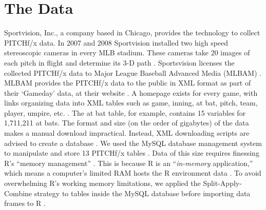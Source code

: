 \section{The Data} %
Sportvision, Inc., a company based in Chicago, provides the technology to collect PITCHf/x\textsuperscript{\textregistered} data. In 2007 and 2008 Sportvision installed two high speed stereoscopic cameras in every MLB\textsuperscript{\textregistered} stadium. These cameras take 20 images of each pitch in flight and determine its 3-D path \citep{Fast2010}. Sportsvision licenses the collected PITCHf/x\textsuperscript{\textregistered} data to Major League Baseball Advanced Media (MLBAM\textsuperscript{\textregistered}) \citep{Baumer2010}. MLBAM\textsuperscript{\textregistered} provides the PITCHf/x\textsuperscript{\textregistered} data to the public in XML format as part of  their  `Gameday' data, at their website \citep{Sievert2014}. A homepage exists for every game, with links organizing data into XML tables such as game, inning, at bat, pitch, team, player, umpire, etc. \citep{Sievert2014}. The at bat table, for example, contains 15 variables for 1,711,211 at bats. The format and size (on the order of gigabytes) of the data makes a manual download impractical. Instead, XML downloading scripts are advised to create a database \citep{Adler2006}. We used the MySQL database management system  to manipulate and store 13 PITCHf/x\textsuperscript{\textregistered} tables \citep{Tahaghoghi2006}. Data of this size requires finessing R's ``memory management'' \citep{Wickham2014}. This is because R is an ``{\it in-memory} application,'' which means a computer's limited RAM hosts the R environment data \citep{Smith2013}. To avoid overwhelming R's working memory limitations, we applied the Split-Apply-Combine strategy to tables inside the MySQL database before importing data frames to R \citep{Wickham2011}.

